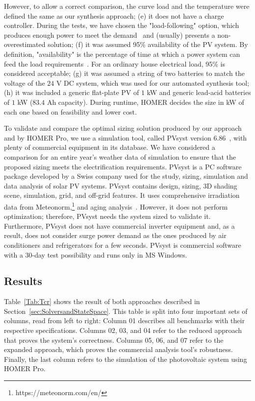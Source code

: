 \documentclass[10pt,journal,compsoc]{IEEEtran}
\begin{document}
However, to allow a correct comparison, the curve load and the temperature were defined the same as our synthesis approach; 
(e) it does not have a charge controller. During the tests, we have chosen the "load-following" option, which produces enough power to meet the demand~\cite{HOMER} and (usually) presents a non-overestimated solution; 
(f) it was assumed 95\% availability of the PV system. By definition, "availability" is the percentage of time at which a power system can feed the load requirements~\cite{Khatib2014}. For an ordinary house electrical load, 95\% is considered acceptable;
(g) it was assumed a string of two batteries to match the voltage of the $24$ V DC system, which was used for our automated synthesis tool; 
(h) it was included a generic flat-plate PV of $1$ kW and generic lead-acid batteries of $1$ kW ($83.4$ Ah capacity). During runtime, HOMER decides the size in kW of each one based on feasibility and lower cost.

To validate and compare the optimal sizing solution produced by our approach and by HOMER Pro, we use a simulation tool, called PVsyst version $6.86$~\cite{PVsyst}, with plenty of commercial equipment in its database. We have considered a comparison for an entire year's weather data of simulation to ensure that the proposed sizing meets the electrification requirements. PVsyst is a PC software package developed by a Swiss company used for the study, sizing, simulation and data analysis of solar PV systems. PVsyst contains design, sizing, 3D shading scene, simulation, grid, and off-grid features. It uses comprehensive irradiation data from Meteonorm,\footnote{https://meteonorm.com/en/} and aging analysis~\cite{PVsyst2017}. However, it does not perform optimization; therefore, PVsyst needs the system sized to validate it. Furthermore, PVsyst does not have commercial inverter equipment and, as a result, does not consider surge power demand as the ones produced by air conditioners and refrigerators for a few seconds. PVsyst is commercial software with a $30$-day test possibility and runs only in MS Windows.

\subsection{Results}

Table~\ref{Tab:Tcr} shows the result of both approaches described in Section~\ref{sec:SolversandStateSpace}. This table is split into four important sets of columns, read from left to right: Column 01 describes all benchmarks with their respective specifications. Columns 02, 03, and 04 refer to the reduced approach that proves the system's correctness. Columns 05, 06, and 07 refer to the expanded approach, which proves the commercial analysis tool's robustness. Finally, the last column refers to the simulation of the photovoltaic system using HOMER Pro.
\end{document}

